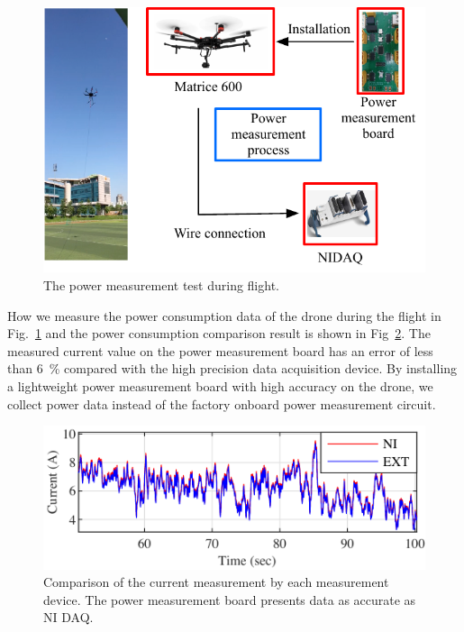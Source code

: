 \documentclass[journal]{./template/IEEEtran}
\begin{document}
\begin{figure}[ht]
\centering
\includegraphics[scale=0.80]{fig3/flight_experiment.pdf}
\caption{The power measurement test during flight.}
\label{fig:flight_test}
\end{figure}

How we measure the power consumption data of the drone during the flight in Fig.~\ref{fig:flight_test} and the power consumption comparison result is shown in Fig~\ref{fig:flight_result}.
The measured current value on the power measurement board has an error of less than 6~\% compared with the high precision data acquisition device. By installing a lightweight power measurement board with high accuracy on the drone, we collect power data instead of the factory onboard power measurement circuit.

\begin{figure}[ht]
\centering
\includegraphics[scale=1.0]{fig4/flight_exp_result.pdf}
\caption{Comparison of the current measurement by each measurement device. The power measurement board presents data as accurate as NI DAQ.}
\label{fig:flight_result}
\end{figure}

\label{Section: Design the power measurement board}
\end{document}

